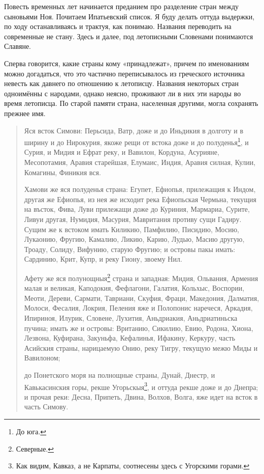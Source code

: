 Повесть временных лет начинается преданием про разделение стран между сыновьями Ноя. Почитаем Ипатьевский список. Я буду делать оттуда выдержки, по ходу останавливаясь и трактуя, как понимаю. Названия переводить на современные не стану. Здесь и далее, под летописными Словенами понимаются Славяне.

Сперва говорится, какие страны кому «принадлежат», причем по именованиям можно догадаться, что это частично переписывалось из греческого источника невесть как давнего по отношению к летописцу. Названия некоторых стран одноимённы с народами, однако неясно, проживают ли в них эти народы во время летописца. По старой памяти страна, населенная другими, могла сохранять прежнее имя.

\begin{quotation}
Яся всток Симови: Перьсида, Ватр, доже и до Иньдикия в долготу и в ширину и до Нирокурия, якоже рещи от встока доже и до полуденья\footnote{До юга.}, и Сурия, и Мидия и Ефрат реку, и Вавилон, Кордуна, Асурияне, Месопотамия, Аравия старейшая, Елумаис, Индия, Аравия силная, Кулии, Комагины, Финикия вся.

Хамови же яся полуденья страна: Егупет, Ефиопья, прилежащия к Индом, другая же Ефиопья, из нея же исходит река Ефиопьская Чермьна, текущия на въсток, Фива, Луви прилежащи доже до Куриния, Мармариа, Сурите, Ливуи другая, Нумидия, Масурия, Мавритания противу сущи Гадиру. Сущим же к встоком имать Киликию, Памфилию, Писидию, Мосию, Лукаонию, Фругию, Камалию, Ликию, Карию, Лудью, Масию другую, Троаду, Солиду, Вифунию, старую Фругию; и островы пакы имать: Сардинию, Крит, Купр, и реку Гиону, звоему Нил.

Афету же яся полунощныя\footnote{Северные.} страна и западная: Мидия, Ольвания, Армения малая и великая, Каподокия, Фефлагони, Галатия, Кольхыс, Воспории, Меоти, Дереви, Сармати, Тавриани, Скуфия, Фраци, Македония, Далматия, Молоси, Фесалия, Локрия, Пеления яже и Полопонис наречеся, Аркадия, Ипириноя, Илурик, Словене, Лухития, Аньдриакия, Аньдриатиньска пучина; имать же и островы: Вританию, Сикилию, Евию, Родона, Хиона, Лезвона, Куфирана, Закуньфа, Кефалинья, Ифакину, Керкуру, часть Асийския страны, нарицаемую Онию, реку Тигру, текущую межю Миды и Вавилоном;

до Понетского моря на полнощные страны, Дунай, Днестр, и Кавькасинския горы, рекше Угорьскыя\footnote{Как видим, Кавказ, а не Карпаты, соотнесены здесь с Угорскими горами.}, и оттуда рекше доже и до Днепра; и прочая реки: Десна, Припеть, Двина, Волхов, Волга, яже идет на всток в часть Симову.
\end{quotation}

